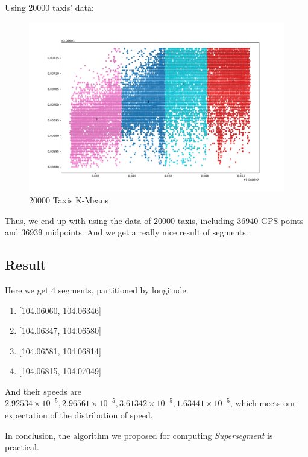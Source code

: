 \documentclass[fontset=none]{ctexart}
\theoremstyle{definition}
\theoremstyle{remark}
\begin{document}
\clearpage
Using 20000 taxis' data:
\begin{figure}[htb]
  \centering
  \includegraphics[width=\textwidth]{images/20000辆车kmeans.png}
  \caption{20000 Taxis K-Means}
  \label{fig: 20000}
\end{figure}

Thus, we end up with using the data of 20000 taxis, including 36940 GPS points and 36939 midpoints.
And we get a really nice result of segments.

\subsection{Result}
Here we get 4 segments, partitioned by longitude.

\begin{enumerate}
  \item \textrm{[104.06060, 104.06346]}
  \item \textrm{[104.06347, 104.06580]}
  \item \textrm{[104.06581, 104.06814]}
  \item \textrm{[104.06815, 104.07049]}
\end{enumerate}

And their speeds are $2.92534\times10^{-5}, 2.96561\times10^{-5}, 3.61342\times10^{-5}, 1.63441\times10^{-5}$,
which meets our expectation of the distribution of speed.

In conclusion, the algorithm we proposed for computing \textit{Supersegment} is practical.

% 
% 
\end{document}
